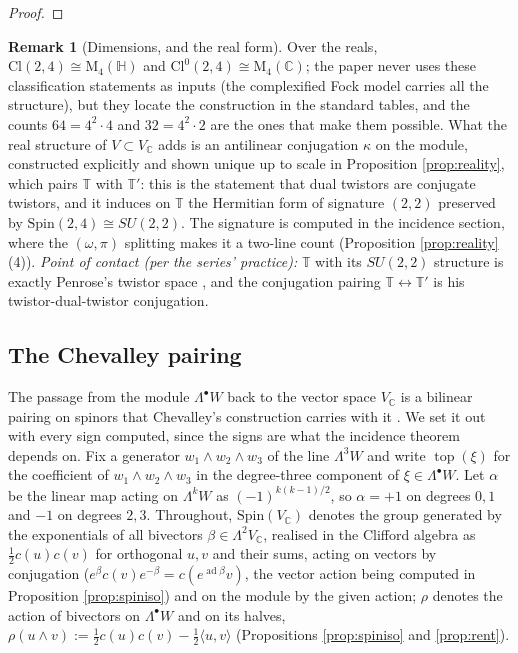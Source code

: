 \documentclass[11pt]{article}
\theoremstyle{definition}
\newtheorem{remark}[theorem]{Remark}
\newcommand{\Cl}{\mathrm{Cl}}
\newcommand{\C}{\mathbb{C}}
\newcommand{\HH}{\mathbb{H}}
\newcommand{\T}{\mathbb{T}}
\newcommand{\Mat}{\mathrm{M}}
\newcommand{\ip}[2]{\langle #1, #2\rangle}
\begin{document}
\begin{proof}
\end{proof}

\begin{remark}[Dimensions, and the real form]\label{rem:dims}
Over the reals, $\Cl(2,4) \cong \Mat_4(\HH)$ and $\Cl^0(2,4) \cong \Mat_4(\C)$; the paper never uses these classification statements as inputs (the complexified Fock model carries all the structure), but they locate the construction in the standard tables, and the counts $64 = 4^2\cdot 4$ and $32 = 4^2 \cdot 2$ are the ones that make them possible. What the real structure of $V \subset V_\C$ adds is an antilinear conjugation $\kappa$ on the module, constructed explicitly and shown unique up to scale in Proposition \ref{prop:reality}, which pairs $\T$ with $\T'$: this is the statement that dual twistors are conjugate twistors, and it induces on $\T$ the Hermitian form of signature $(2,2)$ preserved by $\mathrm{Spin}(2,4) \cong SU(2,2)$. The signature is computed in the incidence section, where the $(\omega, \pi)$ splitting makes it a two-line count (Proposition \ref{prop:reality}(4)). \emph{Point of contact (per the series' practice):} $\T$ with its $SU(2,2)$ structure is exactly Penrose's twistor space \cite{Penrose1967, PenroseRindler86}, and the conjugation pairing $\T \leftrightarrow \T'$ is his twistor-dual-twistor conjugation.
\end{remark}

\subsection{The Chevalley pairing}\label{subsec:chevalley}

The passage from the module $\Lambda^\bullet W$ back to the vector space $V_\C$ is a bilinear pairing on spinors that Chevalley's construction carries with it \cite{Chevalley54}. We set it out with every sign computed, since the signs are what the incidence theorem depends on. Fix a generator $w_1 \wedge w_2 \wedge w_3$ of the line $\Lambda^3 W$ and write $\operatorname{top}(\xi)$ for the coefficient of $w_1\wedge w_2\wedge w_3$ in the degree-three component of $\xi \in \Lambda^\bullet W$. Let $\alpha$ be the linear map acting on $\Lambda^k W$ as $(-1)^{k(k-1)/2}$, so $\alpha = +1$ on degrees $0, 1$ and $-1$ on degrees $2, 3$. Throughout, $\mathrm{Spin}(V_\C)$ denotes the group generated by the exponentials of all bivectors $\beta \in \Lambda^2 V_\C$, realised in the Clifford algebra as $\tfrac12 c(u)c(v)$ for orthogonal $u, v$ and their sums, acting on vectors by conjugation ($e^{\beta} c(v) e^{-\beta} = c(e^{\operatorname{ad}\beta} v)$, the vector action being computed in Proposition \ref{prop:spiniso}) and on the module by the given action; $\rho$ denotes the action of bivectors on $\Lambda^\bullet W$ and on its halves, $\rho(u\wedge v) := \tfrac12 c(u)c(v) - \tfrac12\ip{u}{v}$ (Propositions \ref{prop:spiniso} and \ref{prop:rent}).
\end{document}
